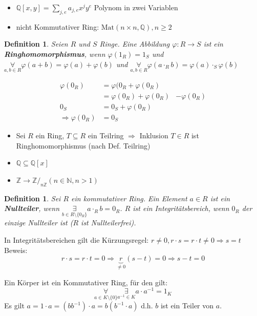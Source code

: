 \documentclass{article}
\newtheorem{defi}[thm]{Definition}
\newcommand{\N}{\mathbb{N}}
\newcommand{\Z}{\mathbb{Z}}
\newcommand{\Q}{\mathbb{Q}}
\newcommand{\Mat}{\text{Mat}}
\begin{document}
\begin{itemize}
    \item
        $\Q[x,y]=\sum_{j,e}a_{j,e}x^jy^e$
        Polynom in zwei Variablen
    \item
        nicht Kommutativer Ring:
        $\Mat(n\times n,\Q),n\geq 2$
\end{itemize}

\begin{defi}
    Seien $R$ und $S$ Ringe. Eine Abbildung
    $\varphi:R\rightarrow S$ ist ein
    \textbf{Ringhomomorphismus}, wenn $\varphi(1_R)=1_S$ und
    $\underset{a,b\in R}\forall\varphi(a+b)
    =\varphi(a)+\varphi(b)$ und $\underset{a,b\in R}\forall
    \varphi(a\cdot_R b)=\varphi(a)\cdot_S\varphi(b)$
\end{defi}
\color{blue}
\begin{align*}
\varphi(0_R)
&=\varphi(0_R+\varphi(0_R)\\
&=\varphi(0_R)+\varphi(0_R)&-\varphi(0_R)\\
0_S&=0_S+\varphi(0_R)\\
\Rightarrow\varphi(0_R)&=0_S
\end{align*}
\color{purple}
\begin{itemize}
    \item
        Sei $R$ ein Ring, $T\subseteq R$ ein Teilring
        $\Rightarrow$ Inklusion $T\in R$ ist Ringhomomorphismus
        (nach Def. Teilring)
    \item
        $\Q\subseteq\Q[x]$
    \item
        $\Z\rightarrow \Z/_{n\Z}(n\in\N,n>1)$
\end{itemize}
\color{black}
\begin{defi}
    Sei $R$ ein kommutativer Ring.
    Ein Element $a\in R$ ist ein \textbf{Nullteiler},
    wenn $\underset{b\in R\setminus\{0_R\}}\exists
    a\cdot_R b=0_R$. $R$ ist ein Integritätsbereich,
    wenn $0_R$ der einzige Nullteiler ist
    ($R$ ist Nullteilerfrei).
\end{defi}
In Integritätsbereichen gilt die Kürzungsregel:
$r\neq 0,r\cdot s=r\cdot t\neq 0\Rightarrow s=t$
Beweis:
\begin{equation*}
    r\cdot s=r\cdot t=0\Rightarrow \underbrace{r}_{\neq 0}
    (s-t)=0\Rightarrow s-t=0
\end{equation*}

Ein Körper ist ein Kommutativer Ring, für den gilt:
\begin{equation*}
    \underset{a\in K\setminus\{0\}}
    \forall\underset{a^{-1}\in K}\exists
    a\cdot a^{-1}=1_K
\end{equation*}
Es gilt $a=1\cdot a=(bb^{-1})\cdot a=b(b^{-1}\cdot a)$
d.h. $b$ ist ein Teiler von $a$.
\end{document}
